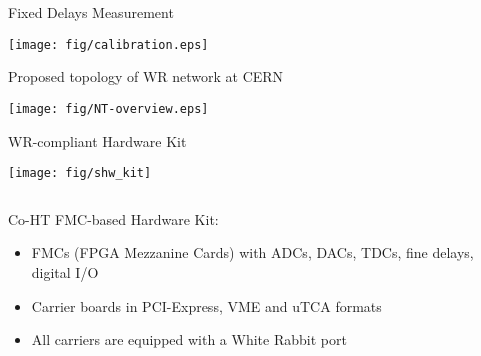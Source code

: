 \documentclass[compress,red]{beamer}
\begin{document}
\begin{frame}{Fixed Delays Measurement}

  \begin{center}
  \texttt{[image: fig/calibration.eps]}
  \end{center}

\end{frame}
\begin{frame}{Proposed topology of WR network at CERN}

    \begin{center}
    \texttt{[image: fig/NT-overview.eps]}
    \end{center}

\end{frame}
\begin{frame}{WR-compliant Hardware Kit}

    \begin{center}
    \texttt{[image: fig/shw\_kit]}
    \end{center}

  \begin{columns}[c]

	\begin{block}{Co-HT FMC-based Hardware Kit:}
	  \begin{itemize}
	  \item FMCs (FPGA Mezzanine Cards) with ADCs, DACs, TDCs, fine delays, digital I/O
	  \item Carrier boards in PCI-Express, VME and uTCA formats
	  \item All carriers are equipped with a White Rabbit port
	  \end{itemize}
	\end{block}

  \end{columns}


\end{frame}
\end{document}
